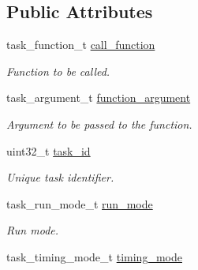 \subsection*{Public Attributes}
\begin{DoxyCompactItemize}
\item 
\hypertarget{structtask__entry__t_a4e63a0996dcac953b3c7f3a3353e237a}{task\+\_\+function\+\_\+t \hyperlink{structtask__entry__t_a4e63a0996dcac953b3c7f3a3353e237a}{call\+\_\+function}}\label{structtask__entry__t_a4e63a0996dcac953b3c7f3a3353e237a}

\begin{DoxyCompactList}\small\item\em Function to be called. \end{DoxyCompactList}\item 
\hypertarget{structtask__entry__t_a24c4dfb5680c5925579c5b9678fa4d26}{task\+\_\+argument\+\_\+t \hyperlink{structtask__entry__t_a24c4dfb5680c5925579c5b9678fa4d26}{function\+\_\+argument}}\label{structtask__entry__t_a24c4dfb5680c5925579c5b9678fa4d26}

\begin{DoxyCompactList}\small\item\em Argument to be passed to the function. \end{DoxyCompactList}\item 
\hypertarget{structtask__entry__t_af0d5939c15a92cd44d8576c9c0627ef2}{uint32\+\_\+t \hyperlink{structtask__entry__t_af0d5939c15a92cd44d8576c9c0627ef2}{task\+\_\+id}}\label{structtask__entry__t_af0d5939c15a92cd44d8576c9c0627ef2}

\begin{DoxyCompactList}\small\item\em Unique task identifier. \end{DoxyCompactList}\item 
\hypertarget{structtask__entry__t_a36f75f3ef1eaa2f807e93c16dc292c21}{task\+\_\+run\+\_\+mode\+\_\+t \hyperlink{structtask__entry__t_a36f75f3ef1eaa2f807e93c16dc292c21}{run\+\_\+mode}}\label{structtask__entry__t_a36f75f3ef1eaa2f807e93c16dc292c21}

\begin{DoxyCompactList}\small\item\em Run mode. \end{DoxyCompactList}\item 
\hypertarget{structtask__entry__t_adbea42ffe5bad11ae2d06196041923e6}{task\+\_\+timing\+\_\+mode\+\_\+t \hyperlink{structtask__entry__t_adbea42ffe5bad11ae2d06196041923e6}{timing\+\_\+mode}}\label{structtask__entry__t_adbea42ffe5bad11ae2d06196041923e6}


\end{DoxyCompactItemize}

